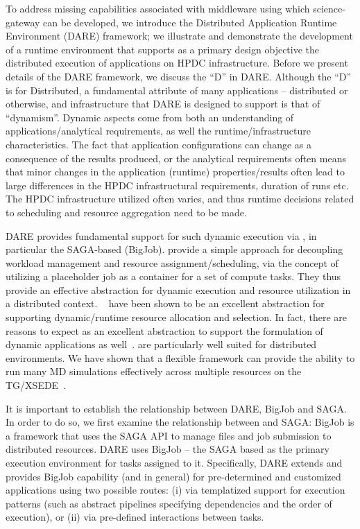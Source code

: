 \documentclass[]{svjour3}
\begin{document}
To address missing capabilities associated with middleware using which
science-gateway can be developed, we introduce the Distributed
Application Runtime Environment (DARE) framework; we illustrate and
demonstrate the development of a runtime environment that supports as
a primary design objective the distributed execution of applications
on HPDC infrastructure.  Before we present details of the DARE
framework, we discuss the ``D'' in DARE. Although the ``D'' is for
Distributed, a fundamental attribute of many applications --
distributed or otherwise, and infrastructure that DARE is designed to
support is that of ``dynamism''.  Dynamic aspects come from both an
understanding of applications/analytical requirements, as well the
runtime/infrastructure characteristics.  The fact that application
configurations can change as a consequence of the results produced, or
the analytical requirements often means that minor changes in the
application (runtime) properties/results often lead to large
differences in the HPDC infrastructural requirements, duration of runs
etc. The HPDC infrastructure utilized often varies, and thus runtime
decisions related to scheduling and resource aggregation need to be
made.

DARE provides fundamental support for such dynamic execution via
\pilotjobs, in particular the SAGA-based \pilotjob (BigJob).
\pilotjobs provide a simple approach for decoupling workload
management and resource assignment/scheduling, via the concept of
utilizing a placeholder job as a container for a set of compute tasks.
They thus provide an effective abstraction for dynamic execution and
resource utilization in a distributed context.
\pilotjobs~\cite{pstar12} have been shown to be an excellent
abstraction for supporting dynamic/runtime resource allocation and
selection.  In fact, there are reasons to expect \pilotjobs as an
excellent abstraction to support the formulation of dynamic
applications as well~\cite{pstar12}. \pilotjobs are particularly well
suited for distributed environments.  We have shown that a flexible
\pilotjob framework can provide the ability to run many MD simulations
effectively across multiple resources on the
TG/XSEDE~\cite{saga-royalsoc,saga_bigjob_condor_cloud}.  


It is important to establish the relationship between DARE, BigJob and
SAGA.  In order to do so, we first examine the relationship between
\pilotjobs and SAGA: BigJob is a \pilotjob framework that uses the
SAGA API to manage files and job submission to distributed
resources. DARE uses BigJob -- the SAGA based \pilotjob as the primary
execution environment for tasks assigned to it. Specifically, DARE
extends and provides BigJob capability (and \pilotjobs in general) for
pre-determined and customized applications using two possible routes:
(i) via templatized support for execution patterns (such as
abstract pipelines specifying dependencies and the order of
execution), or (ii) via pre-defined interactions between tasks.
 
\end{document}
